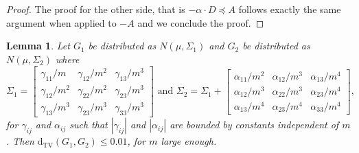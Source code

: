 \documentclass[10pt]{article} %
\theoremstyle{plain}
\newtheorem{lemma}[theorem]{Lemma}
\newcommand{\dtv}{\mathrm{d_{TV}}}
\begin{document}
\begin{proof}
	The proof for the other side, that is $-\alpha \cdot D \preceq A$ follows exactly the same argument when applied to $-A$ and we conclude the proof.
\end{proof}

\begin{lemma}
	\label{lem:gaussians_tv_small}
	Let $G_1$ be distributed as $N(\mu, \Sigma_1)$ and $G_2$ be distributed as $N(\mu, \Sigma_2)$ where 
	$$\Sigma_1 = 
	\begin{bmatrix}
		\gamma_{11}/m & \gamma_{12}/m^2 & \gamma_{13}/m^3\\
		\gamma_{12}/m^2 & \gamma_{22}/m^2 & \gamma_{23}/m^3 \\
		\gamma_{13}/m^3 & \gamma_{23}/m^3 & \gamma_{33}/m^3
	\end{bmatrix} \text{ and }
	\Sigma_2 = \Sigma_1 + \begin{bmatrix}
		\alpha_{11}/m^2 & \alpha_{12}/m^3 & \alpha_{13}/m^4\\
		\alpha_{12}/m^3 & \alpha_{22}/m^3 & \alpha_{23}/m^4 \\
		\alpha_{13}/m^4 & \alpha_{23}/m^4 & \alpha_{33}/m^4
	\end{bmatrix},$$
	for $\gamma_{ij}$ and  $\alpha_{ij}$ such that $|\gamma_{ij}|$ and $|\alpha_{ij}|$ are bounded by constants independent of $m$. Then $\dtv(G_1, G_2) \leq 0.01$, for $m$ large enough.
\end{lemma}
\end{document}
